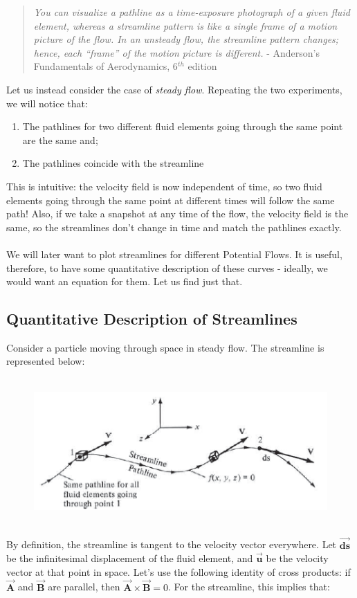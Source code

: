 \documentclass[11pt]{article}
\begin{document}
\begin{quote}
    \emph{You can visualize a pathline as a time-exposure photograph of a given fluid element, whereas a streamline pattern is like a single frame of a motion picture of the flow. In an unsteady flow, the streamline pattern changes; hence, each “frame” of the motion picture is different.} - Anderson's Fundamentals of Aerodynamics, 6$^{th}$ edition
\end{quote}
\noindent
Let us instead consider the case of \emph{steady flow}. Repeating the two experiments, we will notice that:

\begin{enumerate}
    \item The pathlines for two different fluid elements going through the same point are the same and;
    \item The pathlines coincide with the streamline
\end{enumerate}
This is intuitive: the velocity field is now independent of time, so two fluid elements going through the same point at different times will follow the same path! Also, if we take a snapshot at any time of the flow, the velocity field is the same, so the streamlines don't change in time and match the pathlines exactly. \\ \\
\noindent
We will later want to plot streamlines for different Potential Flows. It is useful, therefore, to have some quantitative description of these curves - ideally, we would want an equation for them. Let us find just that.

\subsection{Quantitative Description of Streamlines}
Consider a particle moving through space in steady flow. The streamline is represented below: \\ \\

\begin{figure}[h]
    \includegraphics{streamline.png}
    \centering
\end{figure}
\noindent
\\By definition, the streamline is tangent to the velocity vector everywhere. Let $\vec{\bm{ds}}$ be the infinitesimal displacement of the fluid element, and $\vec{\bm{u}}$ be the velocity vector at that point in space. Let's use the following identity of cross products: if $\vec{\bm{A}}$ and $\vec{\bm{B}}$ are parallel, then $\vec{\bm{A}} \times \vec{\bm{B}} = 0$. For the streamline, this implies that:
\end{document}
